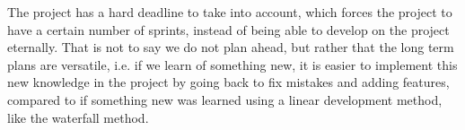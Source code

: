 The project has a hard deadline to take into account, which forces the project to have a certain number of sprints, instead of being able to develop on the project eternally.
That is not to say we do not plan ahead, but rather that the long term plans are versatile, i.e. if we learn of something new, it is easier to implement this new knowledge in the project by going back to fix mistakes and adding features, compared to if something new was learned using a linear development method, like the waterfall method.

